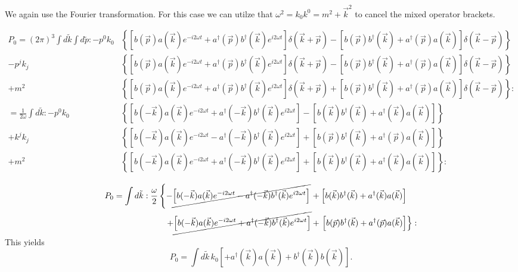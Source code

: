We again use the Fourier transformation. For this case we can utilze that $\omega ^2 =  k_0k^0 = m^2 + \vec{k}^2$ to cancel the mixed operator brackets.


\begin{align}
    P_0 =   (2 \pi)^3 \int d\tilde{k} \int d\tilde{p}:  
     -p^0 k_0 & \left\{ \left[ b(\vec{p})a(\vec{k}) e^{-i 2\omega t} + a^\dagger(\vec{p}) b^\dagger(\vec{k}) e^{i 2\omega t} \right] \delta(\vec{k} + \vec{p}) 
     -  \left[ b(\vec{p})b^\dagger(\vec{k})  + a^\dagger(\vec{p})a(\vec{k}) \right] \delta(\vec{k} - \vec{p}) \right\}  \\
     - p^j k_j & \left\{ \left[ b(\vec{p})a(\vec{k}) e^{-i 2\omega t} + a^\dagger(\vec{p}) b^\dagger(\vec{k}) e^{i 2\omega t} \right]  \delta(\vec{k} + \vec{p})
     - \left[  b(\vec{p})b^\dagger(\vec{k}) + a^\dagger(\vec{p})a(\vec{k})  \right] \delta(\vec{k} - \vec{p})  \right\} \\
    + m^2 & \left\{ \left[ b(\vec{p}) a(\vec{k}) e^{-i 2\omega t} + a^{\dagger}(\vec{p})  b^{\dagger}(\vec{k}) e^{i 2\omega t} \right] \delta(\vec{k} + \vec{p}) 
    +  \left[ b(\vec{p}) b^{\dagger}(\vec{k})  + a^{\dagger}(\vec{p}) a(\vec{k})  \right]\delta(\vec{k} - \vec{p})  \right\} 
    :\\%
    =   \frac{1}{2\omega} \int d\tilde{k}:
     -p^0 k_0 & \left\{ \left[ b(-\vec{k})a(\vec{k}) e^{-i 2\omega t} + a^\dagger(-\vec{k}) b^\dagger(\vec{k}) e^{i 2\omega t} \right] 
                     -  \left[ b(\vec{k})b^\dagger(\vec{k})  + a^\dagger(\vec{k})a(\vec{k}) \right] \right\} \\
     + k^j k_j & \left\{ \left[ b(-\vec{k})a(\vec{k}) e^{-i 2\omega t} - a^\dagger(-\vec{k}) b^\dagger(\vec{k}) e^{i 2\omega t} \right]  
     + \left[  b(\vec{p})b^\dagger(\vec{k}) + a^\dagger(\vec{p})a(\vec{k})  \right]  \right\} \\
    + m^2 & \left\{ \left[ b(-\vec{k}) a(\vec{k}) e^{-i 2\omega t} + a^{\dagger}(-\vec{k})  b^{\dagger}(\vec{k}) e^{i 2\omega t} \right]
    +  \left[ b(\vec{k}) b^{\dagger}(\vec{k})  + a^{\dagger}(\vec{k}) a(\vec{k})  \right] \right\} 
    :
\end{align}

\begin{align}
    P_0 = \int d\tilde{k}:  
     \frac{\omega}{2}  \left\{ - \cancel{\left[ b(-\vec{k})a(\vec{k}) e^{-i 2\omega t} - a^\dagger(-\vec{k}) b^\dagger(\vec{k}) e^{i 2\omega t} \right]}
                       \right. &+  \left[ b(\vec{k})b^\dagger(\vec{k})  + a^\dagger(\vec{k})a(\vec{k}) \right]  \\
     +  \cancel{\left[ b(-\vec{k})a(\vec{k}) e^{-i 2\omega t} + a^\dagger(-\vec{k}) b^\dagger(\vec{k}) e^{i 2\omega t} \right]}
     &+ \left. \left[  b(\vec{p})b^\dagger(\vec{k}) + a^\dagger(\vec{p})a(\vec{k})  \right]  \right\}:
\end{align}
This yields
\begin{equation}
    P_0=  \int d\tilde{k} \,  k_0\left[ 
    +  a^\dagger(\vec{k})a(\vec{k}) +   b^\dagger(\vec{k})b(\vec{k}) 
    \right]. \label{res2}
\end{equation}

